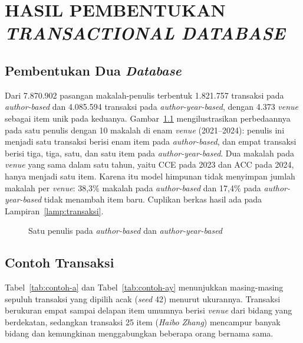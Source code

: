\chapter{HASIL PEMBENTUKAN \textit{TRANSACTIONAL DATABASE}}
\label{chap:transaksi}\label{sec:hasil-t3}

\section{Pembentukan Dua \textit{Database}}
\label{sec:hasil-bentuk}
Dari 7.870.902 pasangan makalah-penulis terbentuk 1.821.757 transaksi pada \textit{author-based} dan 4.085.594 transaksi pada \textit{author-year-based}, dengan 4.373 \textit{venue} sebagai item unik pada keduanya. Gambar~\ref{fig:ilustrasi} mengilustrasikan perbedaannya pada satu penulis dengan 10 makalah di enam \textit{venue} (2021--2024): penulis ini menjadi satu transaksi berisi enam item pada \textit{author-based}, dan empat transaksi berisi tiga, tiga, satu, dan satu item pada \textit{author-year-based}. Dua makalah pada \textit{venue} yang sama dalam satu tahun, yaitu CCE pada 2023 dan ACC pada 2024, hanya menjadi satu item. Karena itu model himpunan tidak menyimpan jumlah makalah per \textit{venue}: 38,3\% makalah pada \textit{author-based} dan 17,4\% pada \textit{author-year-based} tidak menambah item baru. Cuplikan berkas hasil ada pada Lampiran~\ref{lamp:transaksi}.

\begin{figure}[!htb]
\centering
{}
\caption{Satu penulis pada \textit{author-based} dan \textit{author-year-based}}
\label{fig:ilustrasi}
\end{figure}

\section{Contoh Transaksi}
\label{sec:hasil-contoh}
Tabel~\ref{tab:contoh-a} dan Tabel~\ref{tab:contoh-ay} menunjukkan masing-masing sepuluh transaksi yang dipilih acak (\textit{seed} 42) menurut ukurannya. Transaksi berukuran empat sampai delapan item umumnya berisi \textit{venue} dari bidang yang berdekatan, sedangkan transaksi 25 item (\textit{Haibo Zhang}) mencampur banyak bidang dan kemungkinan menggabungkan beberapa orang bernama sama.

